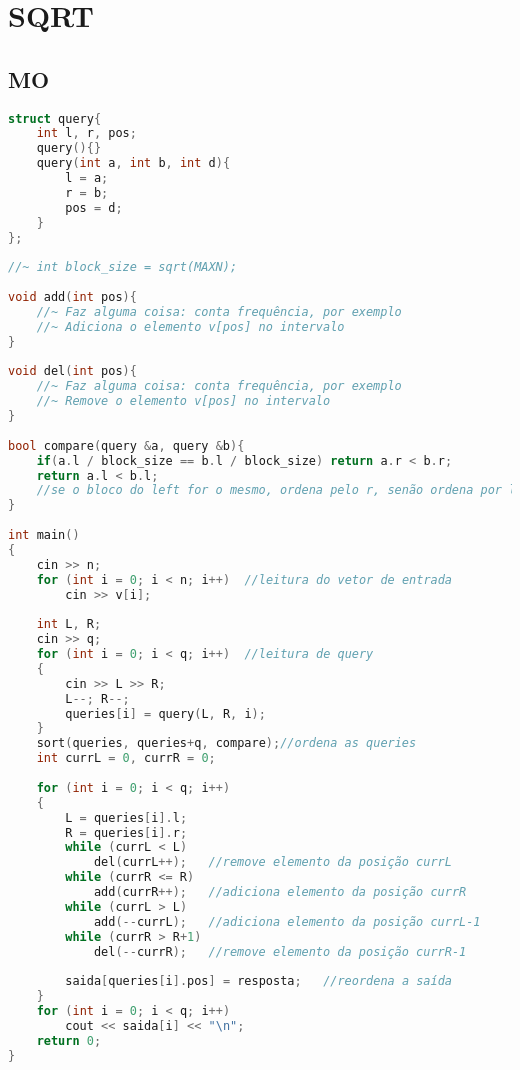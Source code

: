 \documentclass[12pt,a4paper,twoside]{report}
\begin{document}
\chapter{SQRT}
\section{MO}
\noindent\begin{lstlisting}[caption=MO,language=C++]
struct query{
    int l, r, pos;
    query(){}
    query(int a, int b, int d){
        l = a;
        r = b;
        pos = d;
    }
};
 
//~ int block_size = sqrt(MAXN);
 
void add(int pos){
    //~ Faz alguma coisa: conta frequência, por exemplo
    //~ Adiciona o elemento v[pos] no intervalo
}
 
void del(int pos){
    //~ Faz alguma coisa: conta frequência, por exemplo
    //~ Remove o elemento v[pos] no intervalo
}
 
bool compare(query &a, query &b){
    if(a.l / block_size == b.l / block_size) return a.r < b.r;
    return a.l < b.l;
    //se o bloco do left for o mesmo, ordena pelo r, senão ordena por l
}
 
int main()
{
    cin >> n;
    for (int i = 0; i < n; i++)  //leitura do vetor de entrada
        cin >> v[i];
         
    int L, R;
    cin >> q;
    for (int i = 0; i < q; i++)  //leitura de query
    {
        cin >> L >> R;
        L--; R--;
        queries[i] = query(L, R, i);
    }
    sort(queries, queries+q, compare);//ordena as queries
    int currL = 0, currR = 0;
     
    for (int i = 0; i < q; i++)
    {
        L = queries[i].l;
        R = queries[i].r;
        while (currL < L)
            del(currL++);   //remove elemento da posição currL
        while (currR <= R)
            add(currR++);   //adiciona elemento da posição currR
        while (currL > L)
            add(--currL);   //adiciona elemento da posição currL-1
        while (currR > R+1)
            del(--currR);   //remove elemento da posição currR-1
         
        saida[queries[i].pos] = resposta;   //reordena a saída    
    }
    for (int i = 0; i < q; i++)
        cout << saida[i] << "\n";
    return 0;
}
\end{lstlisting}
\end{document}
